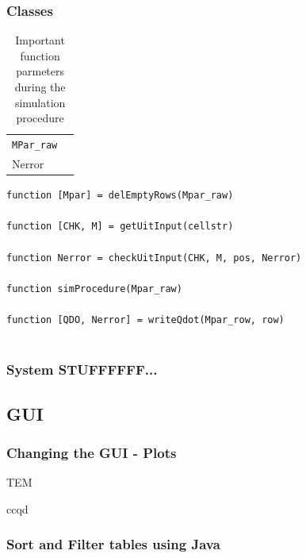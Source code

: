 			\subsubsection{Classes}
			
			\begin{table}[htbp]
			\begin{tabular}{ll}
				\verb|MPar_raw|		&		\\
				Nerror						&		\\
			\end{tabular}
				\caption{Important function parmeters during the simulation procedure}
				\label{tbl:functionSimParmeters}
			\end{table}
				
			\lstinline{function [Mpar] = delEmptyRows(Mpar_raw)} \\ \\
			\lstinline{function [CHK, M] = getUitInput(cellstr)} \\ \\
			\lstinline{function Nerror = checkUitInput(CHK, M, pos, Nerror)} \\ \\
			\lstinline{function simProcedure(Mpar_raw)} \\ \\
			\lstinline{function [QDO, Nerror] = writeQdot(Mpar_row, row)} \\ \\
			
			
		\subsubsection{System STUFFFFFF...}
			
		\subsection{GUI}
			\subsubsection{Changing the GUI - Plots}
			\gls{TEM}
			
			\gls{ccqd}
			
			\subsubsection{Sort and Filter tables using Java}
			
			
						

